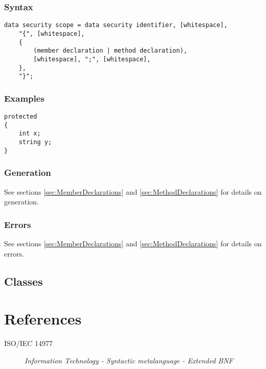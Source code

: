\documentclass[10pt,a4paper]{article}
\begin{document}
\subsubsection{Syntax}
\begin{verbatim}
data security scope = data security identifier, [whitespace],
    "{", [whitespace],
    {
        (member declaration | method declaration),
        [whitespace], ";", [whitespace],
    },
    "}";
\end{verbatim}

\subsubsection{Examples}
\begin{verbatim}
protected
{
    int x;
    string y;
}
\end{verbatim}

\subsubsection{Generation}
See sections \ref{sec:MemberDeclarations} and \ref{sec:MethodDeclarations} for details on generation.

\subsubsection{Errors}
See sections \ref{sec:MemberDeclarations} and \ref{sec:MethodDeclarations} for details on errors.

\newpage





\subsection{Classes}
\label{sec:}






\section{References}
\begin{description}
  \item[ISO/IEC 14977] \textit{Information Technology - Syntactic metalanguage - Extended BNF}
\end{description}
\newpage
\end{document}
